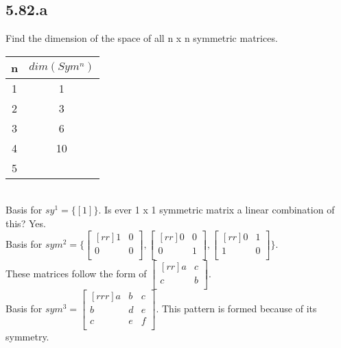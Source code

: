 \documentclass{report}
\theoremstyle{plain}
\theoremstyle{definition}
\theoremstyle{plain}
\begin{document}
\subsection{5.82.a}
Find the dimension of the space of all n x n symmetric matrices.\\
\begin{tabular}{c|c}
n & $dim(Sym^n)$\\
\hline
1 & 1\\
2 & 3\\
3 & 6\\
4 & 10\\
5\\
\end{tabular}\\
Basis for $sy^1=\{[1]\}$. Is ever 1 x 1 symmetric matrix a linear combination of this? Yes.\\
Basis for $sym^2=\{\begin{bmatrix}[rr]1&0\\0&0\\\end{bmatrix},\begin{bmatrix}[rr]0&0\\0&1\\\end{bmatrix},\begin{bmatrix}[rr]0&1\\1&0\\\end{bmatrix}\}$. \\These matrices follow the form of $\begin{bmatrix}[rr]a&c\\c&b\\\end{bmatrix}$.\\
Basis for $sym^3 = \begin{bmatrix}[rrr]a&b&c\\b&d&e\\c&e&f\\\end{bmatrix}$. This pattern is formed because of its symmetry.
\end{document}
